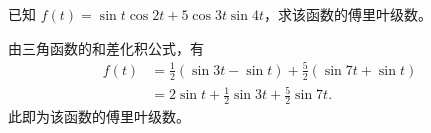 \begin{exercise}
    已知 $f(t) = \sin t\cos 2t + 5\cos 3t \sin 4t$，求该函数的傅里叶级数。
\end{exercise}

\begin{solution}
    由三角函数的和差化积公式，有
    \begin{align*}
        f(t) & = \frac{1}{2}\left(\sin 3t - \sin t\right) + \frac{5}{2}\left(\sin 7t + \sin t\right) \\
        & = 2\sin t + \frac{1}{2}\sin 3t + \frac{5}{2}\sin 7t.
    \end{align*}
    此即为该函数的傅里叶级数。
\end{solution}
